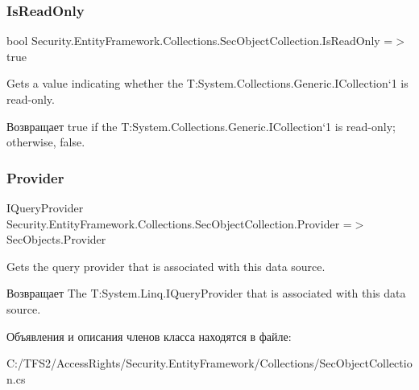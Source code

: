 \subsubsection{\texorpdfstring{Is\+Read\+Only}{IsReadOnly}}
{\footnotesize\ttfamily bool Security.\+Entity\+Framework.\+Collections.\+Sec\+Object\+Collection.\+Is\+Read\+Only =$>$ true}



Gets a value indicating whether the T\+:\+System.\+Collections.\+Generic.\+I\+Collection`1 is read-\/only. 

\begin{DoxyReturn}{Возвращает}
true if the T\+:\+System.\+Collections.\+Generic.\+I\+Collection`1 is read-\/only; otherwise, false. 
\end{DoxyReturn}
\mbox{\label{class_security_1_1_entity_framework_1_1_collections_1_1_sec_object_collection_a30605924c42e5bf191768f76596bb9c6}} 
\subsubsection{\texorpdfstring{Provider}{Provider}}
{\footnotesize\ttfamily I\+Query\+Provider Security.\+Entity\+Framework.\+Collections.\+Sec\+Object\+Collection.\+Provider =$>$ Sec\+Objects.\+Provider}



Gets the query provider that is associated with this data source. 

\begin{DoxyReturn}{Возвращает}
The T\+:\+System.\+Linq.\+I\+Query\+Provider that is associated with this data source. 
\end{DoxyReturn}


Объявления и описания членов класса находятся в файле\+:\begin{DoxyCompactItemize}
\item 
C\+:/\+T\+F\+S2/\+Access\+Rights/\+Security.\+Entity\+Framework/\+Collections/Sec\+Object\+Collection.\+cs\end{DoxyCompactItemize}
